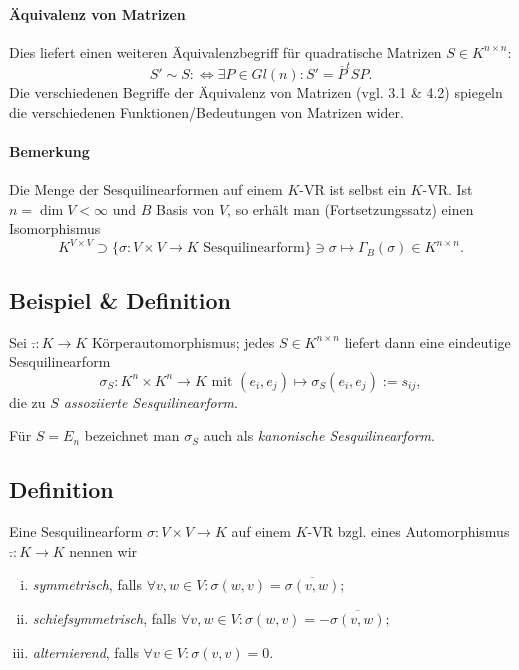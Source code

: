 \paragraph{Äquivalenz von Matrizen}
Dies liefert einen weiteren Äquivalenzbegriff für quadratische Matrizen $ S\in K^{n\times n} $:
		\[ S' \sim S :\Leftrightarrow \exists  P\in Gl(n): S' = \overline{P}^tSP. \]
	Die verschiedenen Begriffe der Äquivalenz von Matrizen (vgl. 3.1 \& 4.2) spiegeln die verschiedenen Funktionen/Bedeutungen von Matrizen wider.
	
\paragraph{Bemerkung}
	Die Menge der Sesquilinearformen auf einem $ K $-VR ist selbst ein $ K $-VR. Ist $ n=\dim V< \infty $ und $ B $ Basis von $ V $, so erhält man (Fortsetzungssatz) einen Isomorphismus
		\[ K^{V\times V}\supset \{\sigma:V\times V\to K \text{ Sesquilinearform}\}\ni \sigma \mapsto \Gamma_B(\sigma)\in K^{n\times n}. \]
\subsection{Beispiel \& Definition} 
\begin{Definition}
	Sei $ \bar{.}:K\to K $ Körperautomorphismus; jedes $ S\in K^{n\times n} $ liefert dann eine eindeutige Sesquilinearform
		\[ \sigma_S:K^n\times K^n \to K \text{ mit } (e_i,e_j)\mapsto \sigma_S(e_i,e_j):= s_{ij}, \] 
	die zu \emph{$ S $ assoziierte Sesquilinearform}.

	Für $ S = E_n $ bezeichnet man $ \sigma_S $ auch als \emph{kanonische Sesquilinearform}.
\end{Definition}

\subsection{Definition}
\begin{Definition}
	Eine Sesquilinearform $ \sigma:V\times V\to K $ auf einem $ K $-VR bzgl. eines Automorphismus $ \bar{.}:K\to K $ nennen wir
		\begin{enumerate}[(i)]
			\item \emph{symmetrisch}, falls \hfill $\forall v,w\in V: \sigma(w,v) = \overline{\sigma(v,w)} $;
			\item \emph{schiefsymmetrisch}, falls \hfill $ \forall v,w\in V: \sigma(w,v) = - \overline{\sigma(v,w)}$;
			\item \emph{alternierend}, falls \hfill $\forall v \in V: \sigma(v,v) = 0.$
		\end{enumerate}
\end{Definition}

